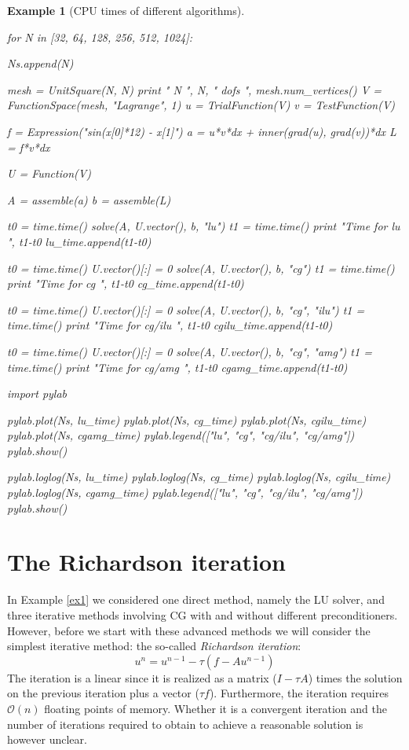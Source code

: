 \documentclass[a4paper,11pt]{amsart}
\newtheorem{example}{Example}[section]
\begin{document}
\begin{example}[CPU times of different algorithms]
\begin{python}
for N in [32, 64, 128, 256, 512, 1024]:

  Ns.append(N)

  mesh = UnitSquare(N, N)
  print " N ", N, " dofs ", mesh.num_vertices()
  V = FunctionSpace(mesh, "Lagrange", 1)
  u = TrialFunction(V)
  v = TestFunction(V)

  f = Expression("sin(x[0]*12) - x[1]")
  a = u*v*dx  + inner(grad(u), grad(v))*dx
  L = f*v*dx

  U = Function(V)

  A = assemble(a)
  b = assemble(L)

  t0 = time.time()
  solve(A, U.vector(), b, "lu")
  t1 = time.time()
  print "Time for lu ", t1-t0
  lu_time.append(t1-t0)

  t0 = time.time()
  U.vector()[:] = 0
  solve(A, U.vector(), b, "cg")
  t1 = time.time()
  print "Time for cg ", t1-t0
  cg_time.append(t1-t0)

  t0 = time.time()
  U.vector()[:] = 0
  solve(A, U.vector(), b, "cg", "ilu")
  t1 = time.time()
  print "Time for cg/ilu ", t1-t0
  cgilu_time.append(t1-t0)

  t0 = time.time()
  U.vector()[:] = 0
  solve(A, U.vector(), b, "cg", "amg")
  t1 = time.time()
  print "Time for cg/amg ", t1-t0
  cgamg_time.append(t1-t0)


import pylab

pylab.plot(Ns, lu_time)
pylab.plot(Ns, cg_time)
pylab.plot(Ns, cgilu_time)
pylab.plot(Ns, cgamg_time)
pylab.legend(["lu", "cg", "cg/ilu", "cg/amg"])
pylab.show()

pylab.loglog(Ns, lu_time)
pylab.loglog(Ns, cg_time)
pylab.loglog(Ns, cgilu_time)
pylab.loglog(Ns, cgamg_time)
pylab.legend(["lu", "cg", "cg/ilu", "cg/amg"])
pylab.show()
\end{python}
\end{example}

\section{The Richardson iteration}
In Example \ref{ex1} we considered one direct method, namely the LU solver, and three
iterative methods involving CG with and without different preconditioners.
However, before we start with these advanced methods we will consider the
simplest iterative method: the so-called \textit{Richardson iteration}:
\[
u^n = u^{n-1}  - \tau (f - A u^{n-1})
\]
The iteration is a linear since it is realized as a matrix ($I-\tau A$) times
the solution on the previous iteration plus a vector ($\tau f$).
Furthermore, the iteration requires $\mathcal{O}(n)$ floating points of memory.
Whether it is a convergent iteration and
the number of iterations required to obtain to achieve a reasonable solution is however
unclear.
\end{document}
